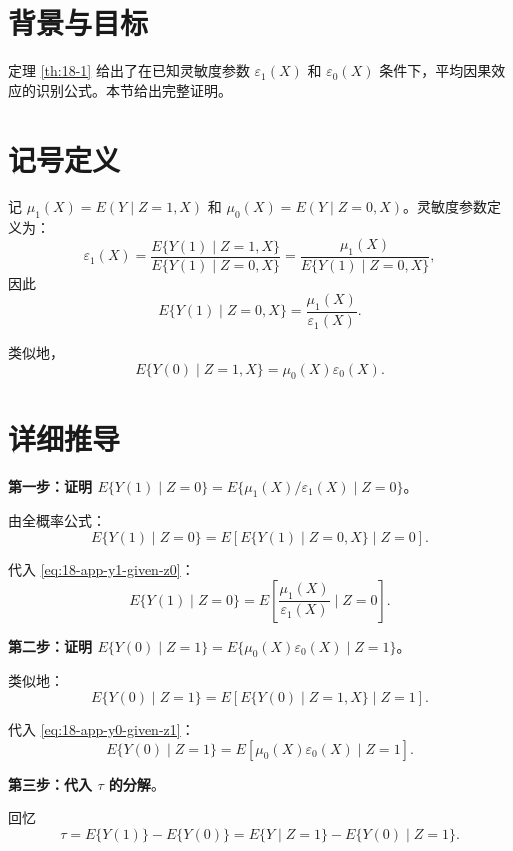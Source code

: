 \section{背景与目标}\label{sec:appendix-18-th1-bg}

定理 \ref{th:18-1} 给出了在已知灵敏度参数 $\varepsilon_1(X)$ 和 $\varepsilon_0(X)$ 条件下，平均因果效应的识别公式。本节给出完整证明。

\section{记号定义}\label{sec:appendix-18-th1-notation}

记 $\mu_1(X) = E(Y \mid Z=1, X)$ 和 $\mu_0(X) = E(Y \mid Z=0, X)$。灵敏度参数定义为：
\[
\varepsilon_1(X) = \frac{E\{Y(1) \mid Z=1, X\}}{E\{Y(1) \mid Z=0, X\}} = \frac{\mu_1(X)}{E\{Y(1) \mid Z=0, X\}} ,
\]
因此
\begin{equation}
E\{Y(1) \mid Z=0, X\} = \frac{\mu_1(X)}{\varepsilon_1(X)} .
\label{eq:18-app-y1-given-z0}
\end{equation}

类似地，
\begin{equation}
E\{Y(0) \mid Z=1, X\} = \mu_0(X)\varepsilon_0(X) .
\label{eq:18-app-y0-given-z1}
\end{equation}

\section{详细推导}\label{sec:appendix-18-th1-derivation}

\textbf{第一步：证明 $E\{Y(1) \mid Z=0\} = E\{\mu_1(X)/\varepsilon_1(X) \mid Z=0\}$}。

由全概率公式：
\[
E\{Y(1) \mid Z=0\} = E\left[E\{Y(1) \mid Z=0, X\} \mid Z=0\right] .
\]

代入 \cref{eq:18-app-y1-given-z0}：
\[
E\{Y(1) \mid Z=0\} = E\left[\frac{\mu_1(X)}{\varepsilon_1(X)} \mid Z=0\right] .
\]

\textbf{第二步：证明 $E\{Y(0) \mid Z=1\} = E\{\mu_0(X)\varepsilon_0(X) \mid Z=1\}$}。

类似地：
\[
E\{Y(0) \mid Z=1\} = E\left[E\{Y(0) \mid Z=1, X\} \mid Z=1\right] .
\]

代入 \cref{eq:18-app-y0-given-z1}：
\[
E\{Y(0) \mid Z=1\} = E\left[\mu_0(X)\varepsilon_0(X) \mid Z=1\right] .
\]

\textbf{第三步：代入 $\tau$ 的分解}。

回忆
\[
\tau = E\{Y(1)\} - E\{Y(0)\} = E\{Y \mid Z=1\} - E\{Y(0) \mid Z=1\} .
\]

